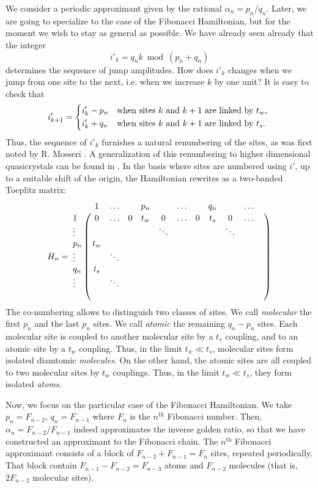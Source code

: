 \documentclass[aps,prl,preprint]{revtex4-1}
\begin{document}
We consider a periodic approximant given by the rational $\alpha_n = p_n/q_n$. Later, we are going to specialize to the case of the Fibonacci Hamiltonian, but for the moment we wish to stay as general as possible.
We have already seen already that the integer
\begin{equation}
	i'_k = q_n k \bmod(p_n+q_n)
\end{equation}
determines the sequence of jump amplitudes. How does $i'_k$ changes when we jump from one site to the next, i.e. when we increase $k$ by one unit? It is easy to check that
\begin{equation}
	i'_{k+1} = \begin{dcases*}
	i'_k - p_n & when sites $k$ and $k+1$ are linked by $t_w$, \\
	i'_k + q_n & when sites $k$ and $k+1$ are linked by $t_s$.
	\end{dcases*}
\end{equation}
Thus, the sequence of $i'_k$ furnishes a natural renumbering of the sites, as was first noted by R. Mosseri \cite{Moss}. A generalization of this renumbering to higher dimensional quasicrystals can be found in \cite{MossSire}.
In the basis where sites are numbered using $i'$, up to a suitable shift of the origin, the Hamiltonian rewrites as a two-banded Toeplitz matrix:
\begin{equation}
	H_n = 
	\bordermatrix{ 
	 	& 1 	&	\ldots & & p_n	& &  \ldots &	& q_n &	& \ldots	&  \cr
    1 	& 0 		& \ldots & 0 & t_w & 0	& \ldots & 0 & t_s	& 0 		& \ldots		 \cr
    \vdots & & & & & \ddots	& & & & \ddots & \cr
    p_n & t_w \cr
    \vdots & & \ddots \cr
    q_n & t_s \cr
    \vdots & & \ddots \cr
     & 
    }
\end{equation}
The co-numbering allows to distinguish two classes of sites. We call \emph{molecular} the first $p_n$ and the last $p_n$ sites. We call \emph{atomic} the remaining $q_n - p_n$ sites.
Each molecular site is coupled to another molecular site by a $t_s$ coupling, and to an atomic site by a $t_w$ coupling. Thus, in the limit $t_w \ll t_s$, molecular sites form isolated diamtomic \emph{molecules}. 
On the other hand, the atomic sites are all coupled to two molecular sites by $t_w$ couplings. Thus, in the limit $t_w \ll t_s$, they form isolated \emph{atoms}.

Now, we focus on the particular case of the Fibonacci Hamiltonian. 
We take $p_n = F_{n-2}$, $q_n = F_{n-1}$ where $F_n$ is the $n^\text{th}$ Fibonacci number. Then, $\alpha_n = F_{n-2}/F_{n-1}$ indeed approximates the inverse golden ratio, so that we have constructed an approximant to the Fibonacci chain.
The $n^\text{th}$ Fibonacci approximant consists of a block of $F_{n-2} + F_{n-1} = F_{n}$ sites, repeated periodically. That block contain $F_{n-1} - F_{n-2} = F_{n-3}$ atoms and $F_{n-2}$ molecules (that is, $2F_{n-2}$ molecular sites).
\end{document}
